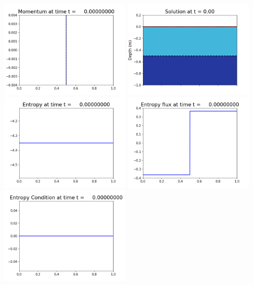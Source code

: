 \documentclass[11pt]{article}
\begin{document}
\vskip 10pt 
\includegraphics[width=0.475\textwidth]{frame0001fig1003.png}
\includegraphics[width=0.475\textwidth]{frame0001fig1006.png}
\vskip 10pt 
\includegraphics[width=0.475\textwidth]{frame0001fig1007.png}
\includegraphics[width=0.475\textwidth]{frame0001fig1008.png}
\vskip 10pt 
\includegraphics[width=0.475\textwidth]{frame0001fig1009.png}
\end{document}
